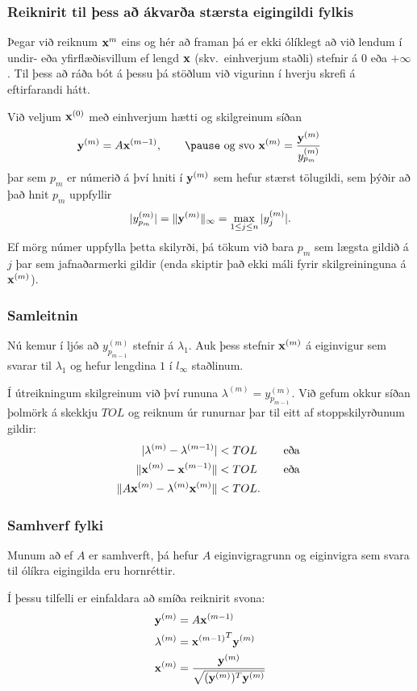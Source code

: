 \documentclass[icelandic,a4paper,12pt]{article}
\begin{document}
\subsubsection{Reiknirit til þess að ákvarða stærsta eigingildi fylkis} 
Þegar við reiknum $\mbox{${\bf x}$}^{m}$ eins og hér að framan þá er ekki ólíklegt að 
við lendum í undir- eða yfirflæðisvillum ef lengd $\mbox{${\bf x}$}$ (skv.~einhverjum staðli)
stefnir á 0 eða $+\infty$. Til þess að ráða bót á þessu þá stöðlum við vigurinn
í hverju skrefi á eftirfarandi hátt.

\pause

\smallskip
Við veljum $\mbox{${\bf x}$}^{(0)}$ með einhverjum hætti og skilgreinum síðan
$$
\yv^{(m)}=A\xv^{(m-1)}, \qquad \pause \text{ og svo }
\xv^{(m)}=\dfrac{\yv^{(m)}}{y_{p_m}^{(m)}} \qquad 
$$
\pause
þar sem $p_m$ er númerið á því hniti í $\mbox{${\bf y}$}^{(m)}$ sem hefur stærst
tölugildi, sem þýðir að það hnit $p_m$ uppfyllir
$$
|y_{p_m}^{(m)}|=\|\mbox{${\bf y}$}^{(m)}\|_\infty=\max_{1\leq j\leq n}|y_j^{(m)}|.
$$
\pause
Ef mörg númer uppfylla þetta skilyrði, þá tökum við bara $p_m$ sem
lægsta gildið á $j$ þar sem jafnaðarmerki gildir \pause
(enda skiptir það ekki máli fyrir skilgreininguna á $\mbox{${\bf x}$}^{(m)}$).


\subsubsection{Samleitnin} 
Nú kemur í ljós að 
$y_{p_{m-1}}^{(m)}$ stefnir á $\lambda_1$. 
Auk þess stefnir $\mbox{${\bf x}$}^{(m)}$ á eiginvigur sem svarar til $\lambda_1$ og hefur 
lengdina $1$ í $l_\infty$ staðlinum.

\pause
\smallskip
Í útreikningum skilgreinum við því rununa
$\lambda^{(m)}=y_{p_{m-1}}^{(m)}$.
Við gefum okkur síðan þolmörk á skekkju $TOL$ og reiknum úr runurnar
þar til eitt af stoppskilyrðunum gildir: 
\begin{align*}
|\lambda^{(m)}-\lambda^{(m-1)}|&<TOL \qquad \text{ eða } \\
\|\mbox{${\bf x}$}^{(m)}-\mbox{${\bf x}$}^{(m-1)}\|&<TOL \qquad \text { eða } \\
\|A\mbox{${\bf x}$}^{(m)}-\lambda^{(m)}\mbox{${\bf x}$}^{(m)}\|&<TOL.
\end{align*}


\subsubsection{Samhverf fylki} 
Munum að ef $A$ er samhverft, þá hefur $A$ eiginvigragrunn og
eiginvigra sem svara til ólíkra eigingilda eru hornréttir. 

\pause
\smallskip
Í þessu tilfelli er einfaldara að smíða reiknirit svona:
\begin{align*}
  \mbox{${\bf y}$}^{(m)}&=A\mbox{${\bf x}$}^{(m-1)}\\
\lambda^{(m)}&={\mbox{${\bf x}$}^{(m-1)}}^T\mbox{${\bf y}$}^{(m)}\\
\mbox{${\bf x}$}^{(m)}&= \frac{\mbox{${\bf y}$}^{(m)}}{\sqrt{(\mbox{${\bf y}$}^{(m)})^T\mbox{${\bf y}$}^{(m)}}}
\end{align*}
\end{document}
